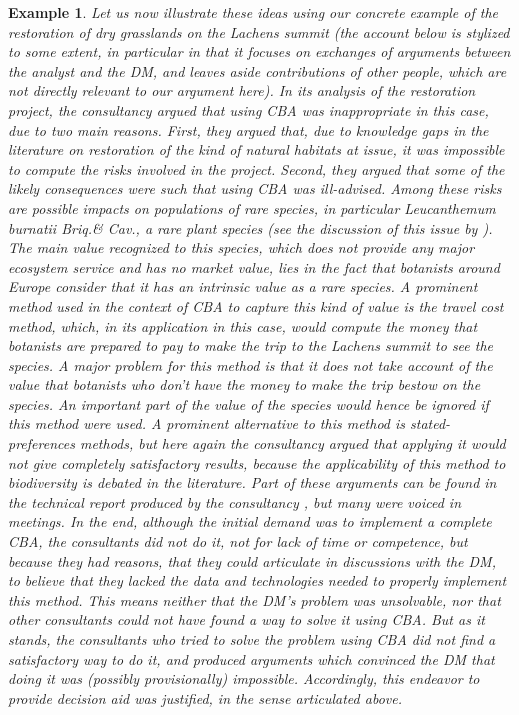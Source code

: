 \documentclass[preprint, french, english, 11pt, authoryear]{elsarticle}%
\newtheorem{example}{Example}
\begin{document}
\begin{example}
Let us now illustrate these ideas using our concrete example of the restoration of dry grasslands on the Lachens summit (the account below is stylized to some extent, in particular in that it focuses on exchanges of arguments between the analyst and the \ac{DM}, and leaves aside contributions of other people, which are not directly relevant to our argument here). In its analysis of the restoration project, the consultancy argued that using CBA was inappropriate in this case, due to two main reasons. First, they argued that, due to knowledge gaps in the literature on restoration of the kind of natural habitats at issue, it was impossible to compute the risks involved in the project. Second, they argued that some of the likely consequences were such that using CBA was ill-advised. Among these risks are possible impacts on populations of rare species, in particular \emph{Leucanthemum burnatii} Briq.\@ \& Cav.\@, a rare plant species (see the discussion of this issue by \citet{meinard_ethical_2016}). The main value recognized to this species, which does not provide any major ecosystem service and has no market value, lies in the fact that botanists around Europe consider that it has an intrinsic value as a rare species. A prominent method used in the context of CBA to capture this kind of value is the travel cost method, which, in its application in this case, would compute the money that botanists are prepared to pay to make the trip to the Lachens summit to see the species. A major problem for this method is that it does not take account of the value that botanists who don't have the money to make the trip bestow on the species. An important part of the value of the species would hence be ignored if this method were used. A prominent alternative to this method is stated-preferences methods, but here again the consultancy argued that applying it would not give completely satisfactory results, because the applicability of this method to biodiversity is debated in the literature. Part of these arguments can be found in the technical report produced by the consultancy \citep{meinard_etude_2015}, but many were voiced in meetings. In the end, although the initial demand was to implement a complete CBA, the consultants did not do it, not for lack of time or competence, but because they had reasons, that they could articulate in discussions with the \ac{DM}, to believe that they lacked the data and technologies needed to properly implement this method. This means neither that the \ac{DM}'s problem was unsolvable, nor that other consultants could not have found a way to solve it using CBA. But as it stands, the consultants who tried to solve the problem using CBA did not find a satisfactory way to do it, and produced arguments which convinced the \ac{DM} that doing it was (possibly provisionally) impossible. Accordingly, this endeavor to provide decision aid was justified, in the sense articulated above.
\end{example}
\end{document}
